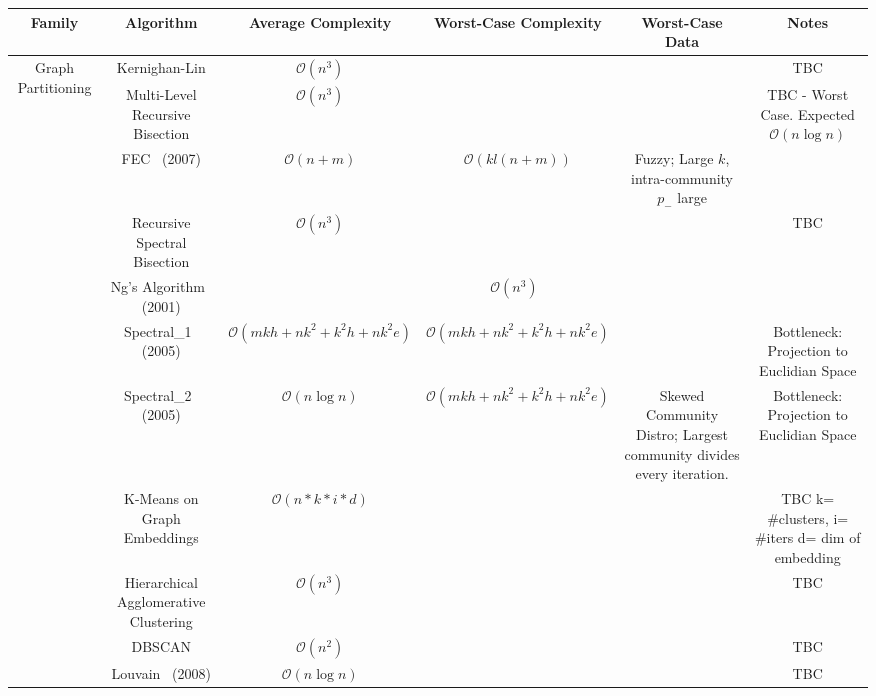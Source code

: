 \begin{landscape}
  \scriptsize
    \begin{table}[t]
      \begin{tabular}{|c|c|c|c|c|c|}
        \hline
        Family & Algorithm & Average Complexity & Worst-Case Complexity & Worst-Case Data & Notes \\
        \hline
        \multirow{5}{*}{Graph Partitioning}       & Kernighan-Lin                         & $\mathcal{O}(n^3)$        & & & TBC \\
                                                  
                                                  & Multi-Level Recursive Bisection       & $\mathcal{O}(n^3)$        & & & TBC - Worst Case. Expected $\mathcal{O}(n \log{n})$\\
                                                  & FEC~\cite{Yang2007} (2007)            & $\mathcal{O}(n+m)$        &$\mathcal{O}(kl(n+m))$ & Fuzzy; Large $k$, intra-community $p_-$ large &  \\
                                                  & Recursive Spectral Bisection          & $\mathcal{O}(n^3)$        & & & TBC \\
        \hline
        \multirow{7}{*}{Graph Clustering}         & Ng's Algorithm~\cite{Ng2001} (2001)   & & $\mathcal{O}(n^3)$~\cite{White2005} & & \\
                                                  & Spectral\_1~\cite{White2005} (2005)   & $\mathcal{O}(mkh+nk^2+k^2h+nk^2e)$ & $\mathcal{O}(mkh+nk^2+k^2h+nk^2e)$ &  & Bottleneck: Projection to Euclidian Space \\
                                                  & Spectral\_2~\cite{White2005} (2005)   & $\mathcal{O}(n\log{n})$        & $\mathcal{O}(mkh+nk^2+k^2h+nk^2e)$ & Skewed Community Distro; Largest community divides every iteration. & Bottleneck: Projection to Euclidian Space\\
                                                  & K-Means on Graph Embeddings           & $\mathcal{O}(n*k*i*d)$    & & & TBC k= \#clusters, i= \#iters d= dim of embedding \\ 
                                                  & Hierarchical Agglomerative Clustering & $\mathcal{O}(n^3)$        & & & TBC \\
                                                  & DBSCAN                                & $\mathcal{O}(n^2)$        & & & TBC \\
                                                  & Louvain~\cite{Blondel2008} (2008)     & $\mathcal{O}(n\log{n})$   & & & TBC \\

\end{tabular}
\end{table}
\end{landscape}

